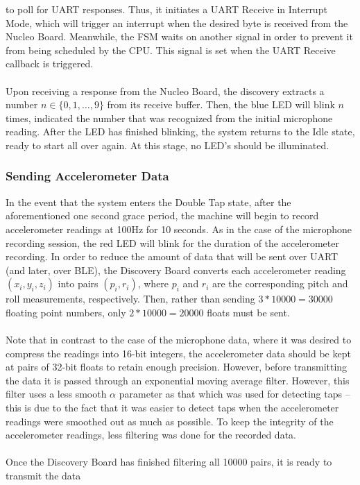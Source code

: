 to poll for UART responses. Thus, it initiates a UART Receive in Interrupt Mode, which will trigger
an interrupt when the desired byte is received from the Nucleo Board. Meanwhile, the FSM waits on
another signal in order to prevent it from being scheduled by the CPU. This signal is set when the
UART Receive callback is triggered.\\\\
Upon receiving a response from the Nucleo Board, the discovery extracts a number
$n\in\{0,1,\dots,9\}$ from its receive buffer. Then, the blue LED will blink $n$ times, indicated
the number that was recognized from the initial microphone reading. After the LED has finished
blinking, the system returns to the Idle state, ready to start all over again. At this stage, no
LED's should be illuminated.
\subsubsection{Sending Accelerometer Data}
In the event that the system enters the Double Tap state, after the aforementioned one second grace
period, the machine will begin to record accelerometer readings at 100Hz for 10 seconds. As in the
case of the microphone recording session, the red LED will blink for the duration of the
accelerometer recording. In order to reduce the
amount of data that will be sent over UART (and later, over BLE), the Discovery Board converts each
accelerometer reading $(x_i,y_i,z_i)$ into pairs $(p_i,r_i)$, where $p_i$ and $r_i$ are the
corresponding pitch and roll measurements, respectively. Then, rather than sending $3*10000=30000$
floating point numbers, only $2*10000=20000$ floats must be sent.\\\\
Note that in contrast to the case of the microphone data, where it was desired to compress the
readings into 16-bit integers, the accelerometer data should be kept at pairs of 32-bit floats to
retain enough precision. However, before transmitting the data it is passed through an exponential
moving average filter. However, this filter uses a less smooth $\alpha$ parameter as that which was
used for detecting taps -- this is due to the fact that it was easier to detect taps when the
accelerometer readings were smoothed out as much as possible. To keep the integrity of the
accelerometer readings, less filtering was done for the recorded data.\\\\
Once the Discovery Board has finished filtering all 10000 pairs, it is ready to transmit the data
